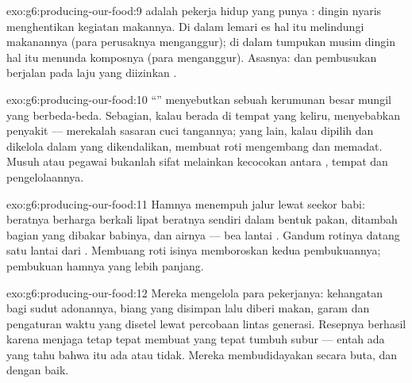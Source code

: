 \begin{solution}{exo:g6:producing-our-food:9}
 adalah pekerja hidup yang punya : dingin nyaris
menghentikan kegiatan makannya. Di dalam lemari es hal itu melindungi
makanannya (para perusaknya menganggur); di dalam tumpukan musim
dingin hal itu menunda komposnya (para  menganggur).
Asasnya:  dan pembusukan berjalan pada laju yang diizinkan
.
\end{solution}

\begin{solution}{exo:g6:producing-our-food:10}
``'' menyebutkan sebuah kerumunan besar  mungil
yang berbeda-beda. Sebagian, kalau berada di tempat yang keliru,
menyebabkan penyakit --- merekalah sasaran cuci tangannya; yang lain,
kalau dipilih dan dikelola dalam  yang dikendalikan, membuat
roti mengembang dan  memadat. Musuh atau pegawai bukanlah sifat
 melainkan kecocokan antara , tempat dan
pengelolaannya.
\end{solution}

\begin{solution}{exo:g6:producing-our-food:11}
Hamnya menempuh jalur lewat seekor babi: beratnya berharga berkali
lipat beratnya sendiri dalam bentuk pakan, ditambah bagian yang
dibakar babinya,  dan airnya --- bea lantai . Gandum
rotinya datang satu lantai dari . Membuang roti isinya
memboroskan kedua pembukuannya; pembukuan hamnya yang lebih panjang.
\end{solution}

\begin{solution}{exo:g6:producing-our-food:12}
Mereka mengelola \emph{} para pekerjanya: kehangatan bagi sudut
adonannya, biang yang disimpan lalu diberi makan, garam dan pengaturan
waktu yang disetel lewat percobaan lintas generasi. Resepnya berhasil
karena menjaga  tetap tepat membuat  yang tepat
tumbuh subur --- entah ada yang tahu bahwa  itu ada atau
tidak. Mereka membudidayakan  secara buta, dan dengan baik.
\end{solution}

